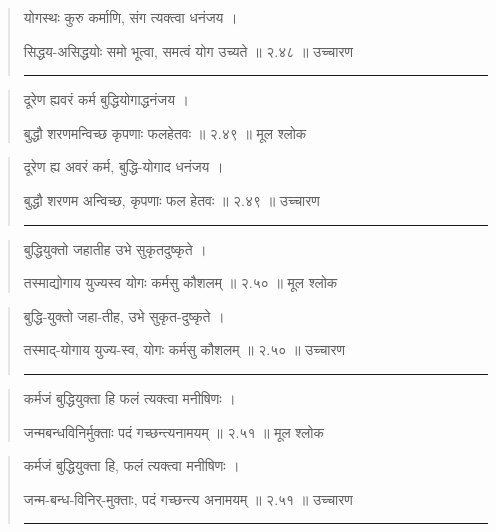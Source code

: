 \begin{quotation}

योगस्थः कुरु कर्माणि, संग त्यक्त्वा धनंजय  ।  

सिद्धय-असिद्धयोः समो भूत्वा, समत्वं योग उच्यते  ॥ २.४८ ॥  उच्चारण

\noindent\rule{16cm}{0.4pt} 
\end{quotation}


\begin{quotation}

दूरेण ह्यवरं कर्म बुद्धियोगाद्धनंजय  ।  

बुद्धौ शरणमन्विच्छ कृपणाः फलहेतवः  ॥ २.४९ ॥  मूल श्लोक
\end{quotation}

\begin{quotation}

दूरेण ह्य अवरं कर्म, बुद्धि-योगाद धनंजय  ।  

बुद्धौ शरणम अन्विच्छ, कृपणाः फल हेतवः  ॥ २.४९ ॥  उच्चारण

\noindent\rule{16cm}{0.4pt} 
\end{quotation}


\begin{quotation}

बुद्धियुक्तो जहातीह उभे सुकृतदुष्कृते  ।  

तस्माद्योगाय युज्यस्व योगः कर्मसु कौशलम्‌  ॥ २.५० ॥  मूल श्लोक
\end{quotation}

\begin{quotation}

बुद्धि-युक्तो जहा-तीह, उभे सुकृत-दुष्कृते  ।  

तस्माद्-योगाय युज्य-स्व, योगः कर्मसु कौशलम्‌  ॥ २.५० ॥  उच्चारण

\noindent\rule{16cm}{0.4pt} 
\end{quotation}


\begin{quotation}

कर्मजं बुद्धियुक्ता हि फलं त्यक्त्वा मनीषिणः  ।  

जन्मबन्धविनिर्मुक्ताः पदं गच्छन्त्यनामयम्‌  ॥ २.५१ ॥  मूल श्लोक
\end{quotation}

\begin{quotation}

कर्मजं बुद्धियुक्ता हि, फलं त्यक्त्वा मनीषिणः  ।  

जन्म-बन्ध-विनिर्-मुक्ताः, पदं गच्छन्त्य अनामयम्‌  ॥ २.५१ ॥  उच्चारण

\noindent\rule{16cm}{0.4pt} 
\end{quotation}


